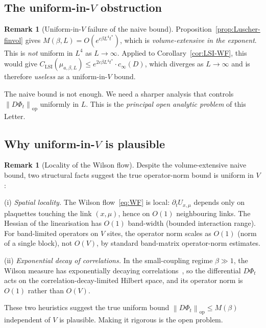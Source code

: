 \documentclass[11pt,a4paper]{amsart}
\theoremstyle{definition}
\newtheorem{remark}[theorem]{Remark}
\newcommand{\norm}[1]{\left\lVert#1\right\rVert}
\begin{document}
\subsection{The uniform-in-$V$ obstruction}
\begin{remark}[Uniform-in-$V$ failure of the naive bound]\label{rem:obstruction}
Proposition~\ref{prop:Luscher-finvol} gives $M(\beta, L) = O(e^{c\beta
L^4 t^*})$, which is \emph{volume-extensive in the exponent}. This is
\emph{not} uniform in $L^4$ as $L\to\infty$. Applied to
Corollary~\ref{cor:LSI-WF}, this would give $C_\mathrm{LSI}(\mu_{a,\beta,L})
\leq e^{2c\beta L^4 t^*}\cdot c_\infty(D)$, which diverges as
$L\to\infty$ and is therefore \emph{useless} as a uniform-in-$V$ bound.

The naive bound is not enough. We need a sharper analysis that
controls $\norm{D\Phi_t}_\mathrm{op}$ uniformly in $L$. This is the
\emph{principal open analytic problem} of this Letter.
\end{remark}

\subsection{Why uniform-in-$V$ is plausible}
\begin{remark}[Locality of the Wilson flow]\label{rem:locality}
Despite the volume-extensive naive bound, two structural facts suggest
the true operator-norm bound is uniform in $V$:

(i) \emph{Spatial locality.} The Wilson flow~\eqref{eq:WF} is local:
$\partial_t U_{x,\mu}$ depends only on plaquettes touching the link
$(x,\mu)$, hence on $O(1)$ neighbouring links. The Hessian of the
linearisation has $O(1)$ band-width (bounded interaction range). For
band-limited operators on $V$ sites, the operator norm scales as
$O(1)$ (norm of a single block), not $O(V)$, by standard band-matrix
operator-norm estimates.

(ii) \emph{Exponential decay of correlations.} In the small-coupling
regime $\beta \gg 1$, the Wilson measure has exponentially decaying
correlations~\cite{Osterwalder1978}, so the differential $D\Phi_t$
acts on the correlation-decay-limited Hilbert space, and its operator
norm is $O(1)$ rather than $O(V)$.

These two heuristics suggest the true uniform bound
$\norm{D\Phi_t}_\mathrm{op} \leq M(\beta)$ independent of $V$ is
plausible. Making it rigorous is the open problem.
\end{remark}
\end{document}
